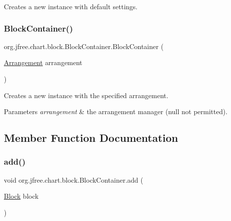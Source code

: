 Creates a new instance with default settings. \mbox{\label{classorg_1_1jfree_1_1chart_1_1block_1_1_block_container_aad8ceaa9889a5fd2815bb9f50d9614ce}} 
\subsubsection{\texorpdfstring{Block\+Container()}{BlockContainer()}\hspace{0.1cm}{\footnotesize\ttfamily [2/2]}}
{\footnotesize\ttfamily org.\+jfree.\+chart.\+block.\+Block\+Container.\+Block\+Container (\begin{DoxyParamCaption}\item[{\mbox{\hyperlink{interfaceorg_1_1jfree_1_1chart_1_1block_1_1_arrangement}{Arrangement}}}]{arrangement }\end{DoxyParamCaption})}

Creates a new instance with the specified arrangement.


\begin{DoxyParams}{Parameters}
{\em arrangement} & the arrangement manager ({\ttfamily null} not permitted). \\
\hline
\end{DoxyParams}


\subsection{Member Function Documentation}
\mbox{\label{classorg_1_1jfree_1_1chart_1_1block_1_1_block_container_a3ff8440bbee1745bbcec898f3a628158}} 
\subsubsection{\texorpdfstring{add()}{add()}\hspace{0.1cm}{\footnotesize\ttfamily [1/2]}}
{\footnotesize\ttfamily void org.\+jfree.\+chart.\+block.\+Block\+Container.\+add (\begin{DoxyParamCaption}\item[{\mbox{\hyperlink{interfaceorg_1_1jfree_1_1chart_1_1block_1_1_block}{Block}}}]{block }\end{DoxyParamCaption})}


